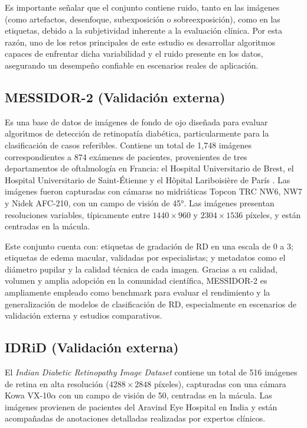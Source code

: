 Es importante señalar que el conjunto contiene ruido, tanto en las imágenes (como 
artefactos, desenfoque, subexposición o sobreexposición), como en las etiquetas, debido a 
la subjetividad inherente a la evaluación clínica. Por esta razón, uno de los retos 
principales de este estudio es desarrollar algoritmos capaces de enfrentar
dicha variabilidad y el ruido presente en los datos, asegurando un desempeño confiable en 
escenarios reales de aplicación.

\subsection{MESSIDOR-2 (Validación externa)}

Es una base de datos de imágenes de fondo de ojo diseñada para evaluar algoritmos de
detección de retinopatía diabética, particularmente para la clasificación de casos
referibles. Contiene un total de 1,748 imágenes correspondientes a 874 exámenes de
pacientes, provenientes de tres departamentos de oftalmología en Francia: el Hospital
Universitario de Brest, el Hospital Universitario de Saint-Étienne y el Hôpital
Lariboisière de París . Las imágenes fueron
capturadas con cámaras no midriáticas Topcon TRC NW6, NW7 y Nidek AFC-210, con
un campo de visión de 45°. Las imágenes presentan resoluciones variables, típicamente
entre $1440 \times 960$ y $2304 \times 1536$ píxeles, y están centradas en la mácula.

Este conjunto cuenta con: etiquetas de gradación de RD en una 
escala de 0 a 3; etiquetas de edema macular, validadas por especialistas; y metadatos 
como el diámetro pupilar y la calidad técnica de cada imagen. Gracias a su calidad, 
volumen y amplia adopción en la comunidad científica, MESSIDOR-2 es ampliamente empleado 
como benchmark para evaluar el rendimiento y la generalización de modelos de 
clasificación de RD, especialmente en escenarios de validación externa y estudios 
comparativos.

\subsection{IDRiD (Validación externa)}

El \textit{Indian Diabetic Retinopathy Image Dataset} contiene un total de 516 imágenes 
de retina en alta resolución ($4288 \times 2848$ píxeles), capturadas con una cámara Kowa 
VX-10$\alpha$ con un campo de visión de 50\textdegree, centradas en la mácula. Las 
imágenes provienen de pacientes del Aravind Eye Hospital en India y están acompañadas de 
anotaciones detalladas realizadas por expertos clínicos.

